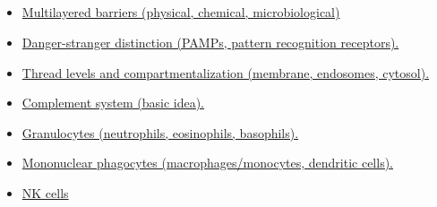 \documentclass[10pt, a4paper]{article}
\newcommand{\MYhref}[3][blue]{\href{#2}{\color{#1}{#3}}}%
\begin{document}
\subsection{\MYhref[melbBlue]{https://notion.so/1d30f48d0118408dbbe64c4c96224099}{Innate Immunity}} \begin{itemize} \item \href{https://www.notion.so/fec1fb88405946999d2c75f6392a87e8}{Multilayered barriers (physical, chemical, microbiological)} \item \href{https://www.notion.so/6e738c936b1e4a4bab07b36d33be6b81}{Danger-stranger distinction (PAMPs, pattern recognition receptors).} \item \href{https://www.notion.so/205985889f7644a288b9e6e8cf7647bd}{Thread levels and compartmentalization (membrane, endosomes, cytosol).} \item \href{https://www.notion.so/945013fe8dd847d1ae7a8316383053f3}{Complement system (basic idea).} \item \href{https://www.notion.so/4359bfa3f3c845b885820a7318cdc6b2}{Granulocytes (neutrophils, eosinophils, basophils).} \item \href{https://www.notion.so/726fd412285e4b999fb2e53b693a55b9}{Mononuclear phagocytes (macrophages/monocytes, dendritic cells).} \item \href{https://www.notion.so/1e8a0d8c78f64621912c2f86df35c9e7}{NK cells} \end{itemize}
\end{document}
